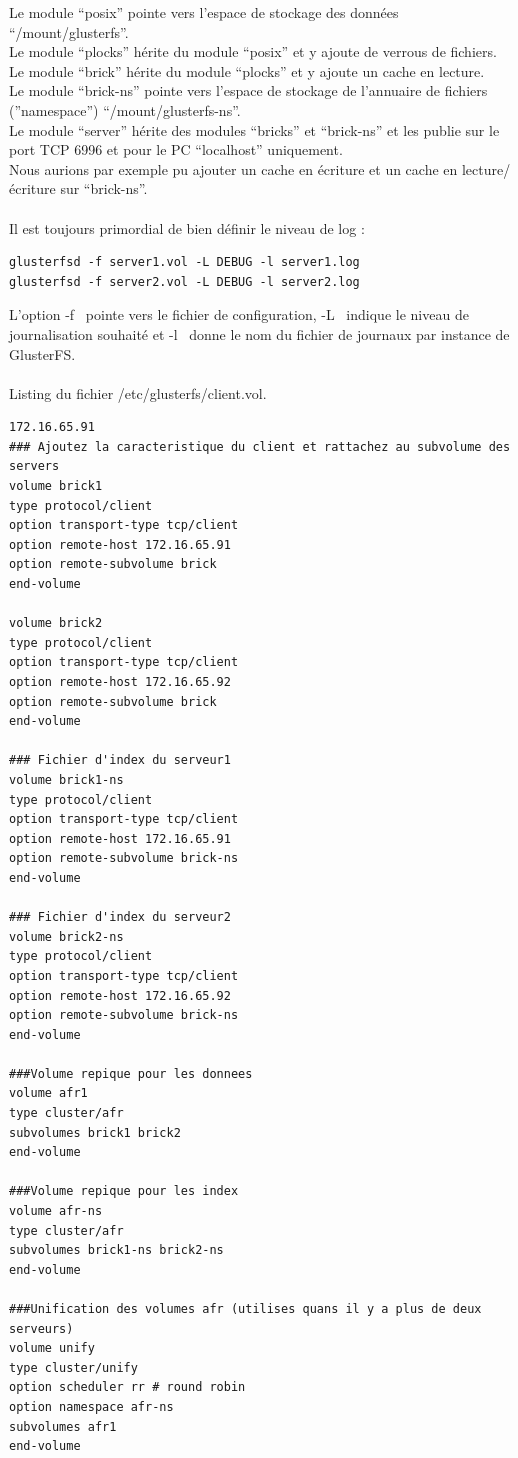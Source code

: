 \documentclass[12pt]{report}
\begin{document}
Le module “posix” pointe vers l'espace de stockage des données “/mount/glusterfs”.\\
Le module “plocks” hérite du module “posix” et y ajoute de verrous de fichiers.\\
Le module “brick” hérite du module “plocks” et y ajoute un cache en lecture.\\
Le module “brick-ns” pointe vers l'espace de stockage de l'annuaire de fichiers (”namespace”) “/mount/glusterfs-ns”.\\
Le module “server” hérite des modules “bricks” et “brick-ns” et les publie sur le port TCP 6996 et pour le PC “localhost” uniquement.\\
Nous aurions par exemple pu ajouter un cache en écriture et un cache en lecture/écriture sur “brick-ns”.\\\\
Il est toujours primordial de bien définir le niveau de log :
\begin{lstlisting}
glusterfsd -f server1.vol -L DEBUG -l server1.log
glusterfsd -f server2.vol -L DEBUG -l server2.log
	  \end{lstlisting}
L'option \og -f\fg~ pointe vers le fichier de configuration, \og -L\fg~  indique le niveau de journalisation souhaité et \og -l\fg~ donne le nom du fichier de journaux par
instance de \og GlusterFS\fg.\\\\
\newpage
Listing du fichier /etc/glusterfs/client.vol.
\begin{lstlisting}172.16.65.91
### Ajoutez la caracteristique du client et rattachez au subvolume des servers
volume brick1
type protocol/client
option transport-type tcp/client
option remote-host 172.16.65.91    
option remote-subvolume brick       
end-volume

volume brick2
type protocol/client
option transport-type tcp/client
option remote-host 172.16.65.92
option remote-subvolume brick      
end-volume

### Fichier d'index du serveur1
volume brick1-ns
type protocol/client
option transport-type tcp/client
option remote-host 172.16.65.91 
option remote-subvolume brick-ns  
end-volume

### Fichier d'index du serveur2
volume brick2-ns
type protocol/client
option transport-type tcp/client
option remote-host 172.16.65.92 
option remote-subvolume brick-ns
end-volume
 
###Volume repique pour les donnees
volume afr1
type cluster/afr
subvolumes brick1 brick2
end-volume
 
###Volume repique pour les index
volume afr-ns
type cluster/afr
subvolumes brick1-ns brick2-ns
end-volume
 
###Unification des volumes afr (utilises quans il y a plus de deux serveurs)
volume unify
type cluster/unify
option scheduler rr # round robin
option namespace afr-ns
subvolumes afr1
end-volume
	  \end{lstlisting}
\end{document}
